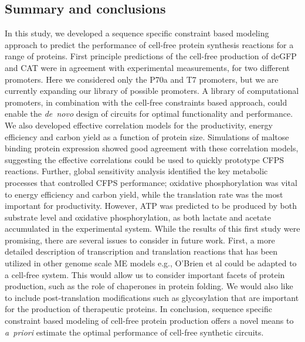\documentclass[journal=asbcd6,manuscript=article]{achemso}
\begin{document}

\subsection{Summary and conclusions}
In this study, we developed a sequence specific constraint based modeling approach to predict the performance of cell-free protein synthesis reactions for a range of proteins.
First principle predictions of the cell-free production of deGFP and CAT were in agreement with experimental measurements, for two different promoters.
Here we considered only the P70a and T7 promoters, but we are currently expanding our library of possible promoters.
A library of computational promoters, in combination with the cell-free constraints based approach,
could enable the \emph{de~novo} design of circuits for optimal functionality and performance.
We also developed effective correlation models for the productivity, energy efficiency and carbon yield as a function of protein size.
Simulations of maltose binding protein expression showed good agreement with these correlation models, suggesting the effective correlations could be used to quickly prototype CFPS reactions.
Further, global sensitivity analysis identified the key metabolic processes that controlled CFPS performance;
oxidative phosphorylation was vital to energy efficiency and carbon yield, while the translation rate was the most important for productivity.
However, ATP was predicted to be produced by both substrate level and oxidative phosphorylation, as both lactate and acetate accumulated in the experimental system.
While the results of this first study were promising, there are several issues to consider in future work.
First, a more detailed description of transcription and translation reactions that has been utilized in other genome scale ME models e.g., O’Brien et al \cite{Brien693} could be adapted
to a cell-free system. This would allow us to consider important facets of protein production, such as the role of chaperones in protein folding.
We would also like to include post-translation modifications such as glycosylation that are important for the production of therapeutic proteins.
In conclusion, sequence specific constraint based modeling of cell-free protein production offers a novel means to \emph{a~priori}
estimate the optimal performance of cell-free synthetic circuits.
\end{document}
